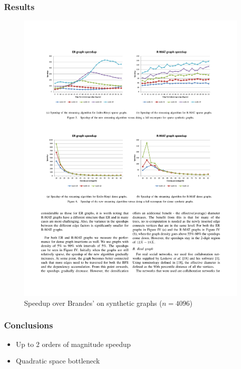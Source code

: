\begin{frame}
  \frametitle{Results}
  
  \begin{figure}[t]
    \centering
    \includegraphics[width=\textwidth, height=0.7\textheight, keepaspectratio]{imgs/green-results1}
    \caption{Speedup over Brandes' on synthetic graphs ($n = 4096$)}
  \end{figure}
    
\end{frame}


\begin{frame}
  \frametitle{Conclusions}

  \begin{itemize}
    \item Up to 2 orders of magnitude speedup
    \item Quadratic space bottleneck
  \end{itemize}
    
\end{frame}
